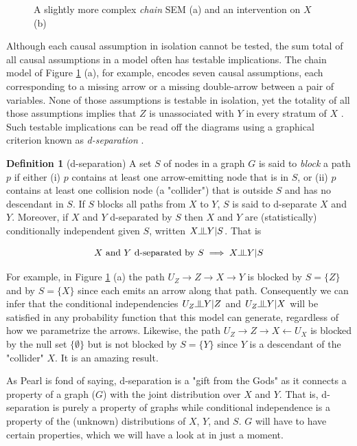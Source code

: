 \documentclass[11pt, oneside]{article}   	%
\newcommand{\indep}{\raisebox{0.05em}{\rotatebox[origin=c]{90}{$\models$}}}
\begin{document}
\begin{figure}
\caption{A slightly more complex \emph{chain} SEM (a) and an intervention on $X$ (b)}
\label{fig:chain_sem}
\end{figure}

\bigskip
\noindent
Although each causal assumption in isolation cannot be tested, the sum total of all causal assumptions in a model often has testable implications. The chain model of 
Figure \ref{fig:chain_sem} (a), for example, encodes seven causal assumptions, each corresponding to a missing arrow or a missing double-arrow between a pair of 
variables. None of those assumptions is testable in isolation, yet the totality of all those assumptions implies that $Z$ is unassociated with $Y$ in every stratum of $X$ . 
Such testable implications can be read off the diagrams using a graphical criterion known as \emph{d-separation} \cite{Pearl:2009:CMR:1642718}. 

\bigskip
\noindent
\textbf{Definition 1} (d-separation) A set $S$ of nodes in a graph $G$ is said to \emph{block} a path $p$ if either (i) $p$ contains at least one arrow-emitting node that is in $S$, 
or (ii) $p$ contains at least one collision node (a "collider") that is outside $S$ and has no descendant in $S$. If $S$ blocks all paths from $X$ to $Y$,
$S$ is said to d-separate $X$ and $Y$. Moreover, if $X$ and $Y$ d-separated by $S$ then $X$ and $Y$ are (statistically) conditionally independent given $S$, 
written $X \indep Y | S$. That is

\begin{equation}
X \text{ and }  Y  \text{ d-separated by } S \implies X \indep Y | S
\end{equation}

\bigskip
\noindent
For example, in Figure \ref{fig:chain_sem} (a) the path $U_Z \rightarrow Z \rightarrow X \rightarrow Y$ is blocked by  $S = \{Z\}$ and by $S = \{X\}$
since each emits an arrow along that path. Consequently we can infer that the conditional independencies $U_Z \indep Y  |Z$ and $U_Z  \indep Y |X$ will be satisfied in 
any probability function that this model can generate, regardless of how we parametrize the arrows. Likewise, the path $U_Z \rightarrow Z \rightarrow X \leftarrow U_X$ is 
blocked by the null set $\{\emptyset\}$  but is not blocked by $S = \{Y\}$ since $Y$ is a descendant of the "collider"  $X$. It is an amazing result.

\bigskip
\noindent
As Pearl is fond of saying, d-separation is a "gift from the Gods" as it connects a property of a graph ($G$) with the joint distribution over $X$ and $Y$. That is, d-separation is
purely a property of graphs while conditional independence is a property of the (unknown) distributions of $X$, $Y$, and $S$.  $G$ will have to have certain properties, which we will 
have a look at in just a moment.
\newpage


\end{document}
